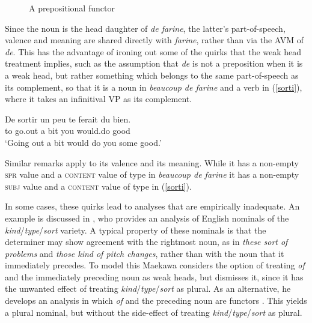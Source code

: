 \documentclass[output=paper
                ,modfonts
                ,nonflat
	        ,collection
	        ,collectionchapter
	        ,collectiontoclongg
 	        ,biblatex
                ,babelshorthands
                ,newtxmath
                ,draftmode
                ,colorlinks, citecolor=brown
]{./langsci/langscibook}
\begin{document}
\begin{figure}
\centering
{}
\caption{\label{beau} A prepositional functor}
\end{figure}

Since the noun is the head daughter of \emph{de farine}, the latter's 
part-of-speech, valence and meaning are shared directly with \emph{farine}, 
rather than via the AVM of \emph{de}. This has the advantage of ironing out
some of the quirks that the weak head treatment implies, such as the assumption 
that \emph{de} is not a preposition when it is a weak head, but rather something 
which belongs to the same part-of-speech as its complement, so that it is 
a noun in \emph{beaucoup de farine} and a verb in (\ref{sorti}), where it takes 
an infinitival VP as its complement.   

\begin{exe} 
\ex\label{sorti}   
\gll   De sortir un peu te ferait du bien. \\
       to go.out a bit you would.do {} good \\
\trans `Going out a bit would do you some good.'
\end{exe}  

\noindent
Similar remarks apply to its valence and its meaning. While it has a non-empty 
\textsc{spr} value and a \textsc{content} value of type  in 
\emph{beaucoup de farine} it has a non-empty \textsc{subj} value and a 
\textsc{content} value of type  in (\ref{sorti}). 

In some cases, these quirks lead to analyses that are empirically inadequate. 
An example is discussed in \citet{Maekawa15}, who provides  
an analysis of English nominals of the \emph{kind}/\emph{type}/\emph{sort} variety.  
A typical property of these nominals is that the determiner may show agreement with the 
rightmost noun, as in \emph{these sort of problems} and \emph{those kind of pitch changes},
rather than with the noun that it immediately precedes. 
To model this Maekawa considers the option of treating \emph{of} and the immediately 
preceding noun as weak heads, but dismisses it, since it has the unwanted effect of treating 
\emph{kind}/\emph{type}/\emph{sort} as plural. 
As an alternative, he develops an analysis in which \emph{of} and 
the preceding noun are functors \citep[149]{Maekawa15}. This yields a plural nominal, but 
without the side-effect of treating \emph{kind}/\emph{type}/\emph{sort} as plural. 
\end{document}
